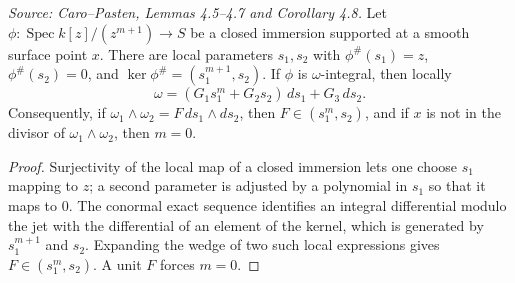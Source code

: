 \begin{lemma}
  \label{lem:cp_local_integral_expressions}
  \textit{Source: Caro--Pasten, Lemmas 4.5--4.7 and Corollary 4.8.}
  Let \(\phi:\operatorname{Spec}k[z]/(z^{m+1})\to S\) be a closed immersion
  supported at a smooth surface point \(x\).  There are local parameters
  \(s_1,s_2\) with \(\phi^\#(s_1)=z\), \(\phi^\#(s_2)=0\), and
  \(\ker\phi^\#=(s_1^{m+1},s_2)\).  If \(\phi\) is \(\omega\)-integral, then
  locally
  \[
    \omega=(G_1s_1^m+G_2s_2)\,ds_1+G_3\,ds_2.
  \]
  Consequently, if \(\omega_1\wedge\omega_2=F\,ds_1\wedge ds_2\), then
  \(F\in(s_1^m,s_2)\), and if \(x\) is not in the divisor of
  \(\omega_1\wedge\omega_2\), then \(m=0\).
\end{lemma}
\begin{proof}
  Surjectivity of the local map of a closed immersion lets one choose
  \(s_1\) mapping to \(z\); a second parameter is adjusted by a polynomial in
  \(s_1\) so that it maps to \(0\).  The conormal exact sequence identifies
  an integral differential modulo the jet with the differential of an element
  of the kernel, which is generated by \(s_1^{m+1}\) and \(s_2\).  Expanding
  the wedge of two such local expressions gives \(F\in(s_1^m,s_2)\).  A unit
  \(F\) forces \(m=0\).
\end{proof}

